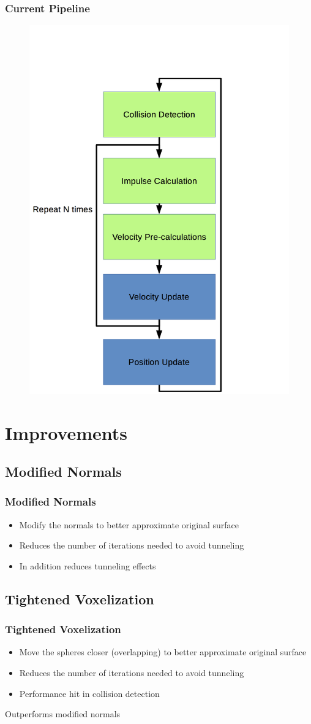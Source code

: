 \documentclass{beamer}
\begin{document}
	\begin{frame}
		\frametitle{Current Pipeline}

		\begin{figure}
			\includegraphics[width=0.45\linewidth]{fig/shaderflow2.png}
		\end{figure}
	\end{frame}

	\section{Improvements}
	\subsection{Modified Normals}
	\begin{frame}
		\frametitle{Modified Normals}
		\begin{itemize}
			\item Modify the normals to better approximate original surface
			\item Reduces the number of iterations needed to avoid tunneling
			\item In addition reduces tunneling effects
		\end{itemize}
	\end{frame}

	\subsection{Tightened Voxelization}
	\begin{frame}
		\frametitle{Tightened Voxelization}
		\begin{itemize}
			\item Move the spheres closer (overlapping) to better approximate original surface
			\item Reduces the number of iterations needed to avoid tunneling
			\item Performance hit in collision detection
		\end{itemize}
		Outperforms modified normals
	\end{frame}
\end{document}
